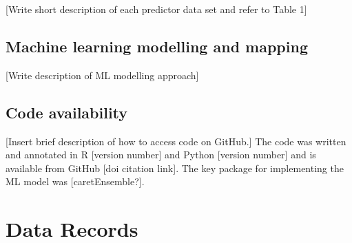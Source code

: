 \documentclass[english]{article}
\begin{document}
[Write short description of each predictor data set and refer to Table 1]

\subsection*{Machine learning modelling and mapping}

[Write description of ML modelling approach]

\subsection*{Code availability}


[Insert brief description of how to access code on GitHub.] The code was written and annotated in R [version number] and Python [version number] and is available from GitHub [doi citation link]. The key package for implementing the ML model was [caretEnsemble?]. 

\section*{Data Records}


\end{document}
